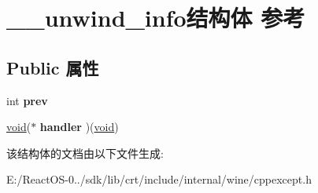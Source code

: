 \hypertarget{struct____unwind__info}{}\section{\+\_\+\+\_\+unwind\+\_\+info结构体 参考}
\label{struct____unwind__info}
\subsection*{Public 属性}
\begin{DoxyCompactItemize}
\item 
\mbox{\label{struct____unwind__info_adbf61db368e1a1c193efed3d9730a6b8}} 
int {\bfseries prev}
\item 
\mbox{\label{struct____unwind__info_ac5e8b8fede443907f62f2137c9594138}} 
\hyperlink{interfacevoid}{void}($\ast$ {\bfseries handler} )(\hyperlink{interfacevoid}{void})
\end{DoxyCompactItemize}


该结构体的文档由以下文件生成\+:\begin{DoxyCompactItemize}
\item 
E\+:/\+React\+O\+S-\/0../sdk/lib/crt/include/internal/wine/cppexcept.\+h\end{DoxyCompactItemize}

